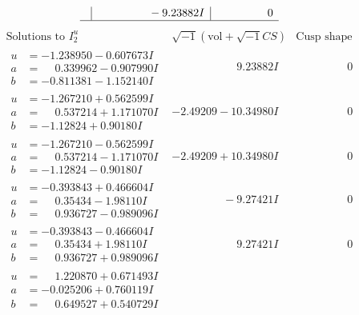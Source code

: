 \documentclass[1p]{elsarticle_modified}
\theoremstyle{definition}
\newcommand{\I}{\sqrt{-1}}
\begin{document}
$$\begin{array}{c|c|c}
 & \phantom{-0.000000 } -9.23882 I & \phantom{-0.000000 } 0\\
 \hline 
 \end{array}$$\newpage$$\begin{array}{c|c|c}  
\text{Solutions to }I^u_{2}& \I (\text{vol} + \sqrt{-1}CS) & \text{Cusp shape}\\
 \hline 
\begin{aligned}
u &= -1.238950 - 0.607673 I \\
a &= \phantom{-}0.339962 - 0.907990 I \\
b &= -0.811381 - 1.152140 I\end{aligned}
 & \phantom{-0.000000 -}9.23882 I & \phantom{-0.000000 } 0 \\ \hline\begin{aligned}
u &= -1.267210 + 0.562599 I \\
a &= \phantom{-}0.537214 + 1.171070 I \\
b &= -1.12824 + 0.90180 I\end{aligned}
 & -2.49209 - 10.34980 I & \phantom{-0.000000 } 0 \\ \hline\begin{aligned}
u &= -1.267210 - 0.562599 I \\
a &= \phantom{-}0.537214 - 1.171070 I \\
b &= -1.12824 - 0.90180 I\end{aligned}
 & -2.49209 + 10.34980 I & \phantom{-0.000000 } 0 \\ \hline\begin{aligned}
u &= -0.393843 + 0.466604 I \\
a &= \phantom{-}0.35434 - 1.98110 I \\
b &= \phantom{-}0.936727 - 0.989096 I\end{aligned}
 & \phantom{-0.000000 } -9.27421 I & \phantom{-0.000000 } 0 \\ \hline\begin{aligned}
u &= -0.393843 - 0.466604 I \\
a &= \phantom{-}0.35434 + 1.98110 I \\
b &= \phantom{-}0.936727 + 0.989096 I\end{aligned}
 & \phantom{-0.000000 -}9.27421 I & \phantom{-0.000000 } 0 \\ \hline\begin{aligned}
u &= \phantom{-}1.220870 + 0.671493 I \\
a &= -0.025206 + 0.760119 I \\
b &= \phantom{-}0.649527 + 0.540729 I\end{aligned}

\end{array}$$
\end{document}
